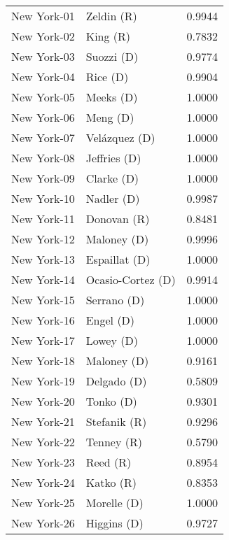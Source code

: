 \begin{longtable}{llr}
       New York-01 &           Zeldin (R) &       0.9944 \\
       New York-02 &             King (R) &       0.7832 \\
       New York-03 &           Suozzi (D) &       0.9774 \\
       New York-04 &             Rice (D) &       0.9904 \\
       New York-05 &            Meeks (D) &       1.0000 \\
       New York-06 &             Meng (D) &       1.0000 \\
       New York-07 &        Velázquez (D) &       1.0000 \\
       New York-08 &         Jeffries (D) &       1.0000 \\
       New York-09 &           Clarke (D) &       1.0000 \\
       New York-10 &           Nadler (D) &       0.9987 \\
       New York-11 &          Donovan (R) &       0.8481 \\
       New York-12 &          Maloney (D) &       0.9996 \\
       New York-13 &        Espaillat (D) &       1.0000 \\
       New York-14 &    Ocasio-Cortez (D) &       0.9914 \\
       New York-15 &          Serrano (D) &       1.0000 \\
       New York-16 &            Engel (D) &       1.0000 \\
       New York-17 &            Lowey (D) &       1.0000 \\
       New York-18 &          Maloney (D) &       0.9161 \\
       New York-19 &          Delgado (D) &       0.5809 \\
       New York-20 &            Tonko (D) &       0.9301 \\
       New York-21 &         Stefanik (R) &       0.9296 \\
       New York-22 &           Tenney (R) &       0.5790 \\
       New York-23 &             Reed (R) &       0.8954 \\
       New York-24 &            Katko (R) &       0.8353 \\
       New York-25 &          Morelle (D) &       1.0000 \\
       New York-26 &          Higgins (D) &       0.9727 \\

\end{longtable}
